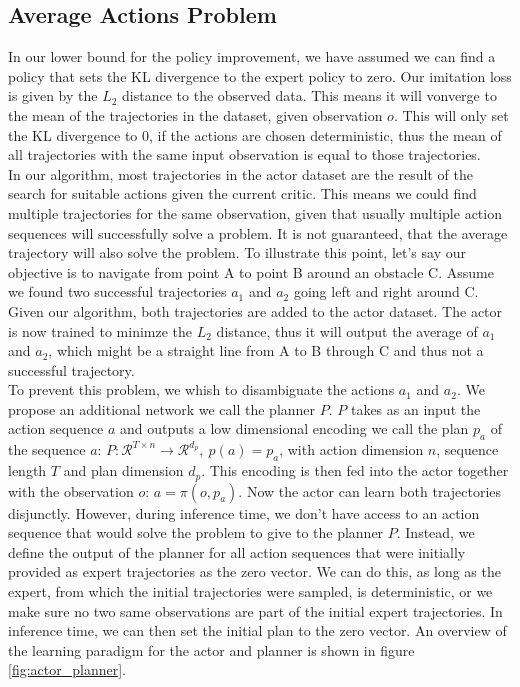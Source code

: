 \subsection{Average Actions Problem}
\label{avr_action_problem}
In our lower bound for the policy improvement, we have assumed we can find a policy that sets the KL divergence to the expert policy to zero. Our imitation loss is given by the $L_2$ distance to the 
observed data. This means it will vonverge to the mean of the trajectories in the dataset, given observation $o$. This will only set the KL divergence to 0, if the actions are chosen deterministic, 
thus the mean of all trajectories with the same input observation is equal to those trajectories.\\
In our algorithm, most trajectories in the actor dataset are the result of the search for suitable actions given the current critic. This means we could find
multiple trajectories for the same observation, given that usually multiple action sequences will successfully solve a problem. It is not guaranteed, that the 
average trajectory will also solve the problem. To illustrate this point, let's say our objective 
is to navigate from point A to point B around an obstacle C. Assume we found two successful trajectories 
$a_1$ and $a_2$ going left and right around C. Given our algorithm, both trajectories are added to the actor dataset. 
The actor is now trained to minimze the $L_2$ distance, thus it will output the average of $a_1$ and $a_2$, which might be a straight line from A to B 
through C and thus not a successful trajectory. \\
To prevent this problem, we whish to disambiguate the actions $a_1$ and $a_2$. We propose an additional network we call the planner $P$. $P$ takes as an input 
the action sequence $a$ and outputs a low dimensional encoding we call the plan $p_a$ of the sequence $a$: 
$P:\mathcal{R}^{T\times n} \rightarrow \mathcal{R}^{d_p},\ p(a) = p_a$, with action dimension $n$, sequence length $T$ and plan dimension $d_p$. This encoding is then fed into the actor together 
with the observation $o$: $a = \pi(o, p_a)$. Now the actor can learn both trajectories disjunctly. However, during inference time, we don't have access to an action sequence 
that would solve the problem to give to the planner $P$. Instead, we define the output of the planner for all action sequences that were initially provided as 
expert trajectories as the zero vector. We can do this, as long as the expert, from which the initial trajectories were sampled, is deterministic, or we make sure 
no two same observations are part of the initial expert trajectories. In inference time, we can then set the initial plan to the zero vector. An overview of the learning 
paradigm for the actor and planner is shown in figure \ref{fig:actor_planner}.

